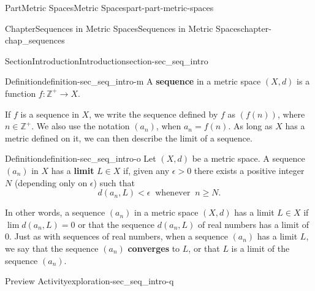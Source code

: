 \documentclass[oneside,10pt,]{book}
\newcommand{\terminology}[1]{\textbf{#1}}
\numberwithin{equation}{chapter}
\newcommand{\Z}{\mathbb{Z}}
\newcommand{\R}{\mathbb{R}}
\newcommand{\lt}{<}
\newcommand{\gt}{>}
\begin{document}
\begin{partptx}{Part}{Metric Spaces}{}{Metric Spaces}{}{}{part-part-metric-spaces}
\begin{chapterptx}{Chapter}{Sequences in Metric Spaces}{}{Sequences in Metric Spaces}{}{}{chapter-chap_sequences}
\begin{sectionptx}{Section}{Introduction}{}{Introduction}{}{}{section-sec_seq_intro}
\begin{definition}{Definition}{}{definition-sec_seq_intro-m}%
%
A \terminology{sequence} in a metric space \((X,d)\) is a function \(f: \Z^+ \to X\).%
\end{definition}
If \(f\) is a sequence in \(X\), we write the sequence defined by \(f\) as \((f(n))\), where \(n \in \Z^+\). We also use the notation \((a_n)\), when \(a_n = f(n)\). As long as \(X\) has a metric defined on it, we can then describe the limit of a sequence.%
\begin{definition}{Definition}{}{definition-sec_seq_intro-o}%
%
Let \((X,d)\) be a metric space. A sequence \((a_n)\) in \(X\) has a \terminology{limit} \(L \in X\) if, given any \(\epsilon \gt 0\) there exists a positive integer \(N\) (depending only on \(\epsilon\)) such that%
\begin{equation*}
d(a_n, L) \lt  \epsilon \ \text{ whenever }  \ n \geq N\text{.}
\end{equation*}
%
\end{definition}
In other words, a sequence \((a_n)\) in a metric space \((X,d)\) has a limit \(L \in X\) if \(\lim d(a_n,L) = 0\) \textemdash{} or that the sequence \(d(a_n,L)\) of real numbers has a limit of \(0\). Just as with sequences of real numbers, when a sequence \((a_n)\) has a limit \(L\), we say that the sequence \((a_n)\) \terminology{converges} to \(L\), or that \(L\) is a limit of the sequence \((a_n)\).%
\begin{exploration}{Preview Activity}{}{exploration-sec_seq_intro-q}%
\end{exploration}
\end{sectionptx}
\end{chapterptx}
\end{partptx}
\end{document}
